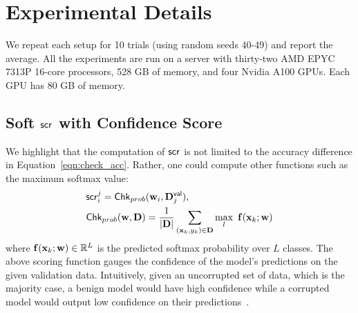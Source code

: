 

\section{Experimental Details}
We repeat each setup for 10 trials (using random seeds 40-49) and report the average.
All the experiments are run on a server with thirty-two AMD EPYC 7313P 16-core processors, 528 GB of memory, and four Nvidia A100 GPUs. Each GPU has 80 GB of memory.




\subsection{Soft $\mathsf{scr}^{}_{}$ with Confidence Score}
\label{app:softscore}
We highlight that the computation of $\mathsf{scr}^{}_{}$ is not limited to the accuracy difference in Equation~\ref{eqn:check_acc}. Rather,  one could compute other functions such as the maximum softmax value:
\begin{align}
\label{eqn:check_prob}
    &\score{i}{j} = \msf{Chk}_{prob}(\bfw_i, \bfD^{\msf{val}}_j) , \\ \nonumber
    &\msf{Chk}_{prob}(\bfw, \bfD) = \frac{1}{|\bfD|} \sum_{(\bfx_k, y_k) \in \bfD} \max_l ~ \bff(\bfx_k; \bfw)
\end{align}
where $\mathbf{f}(\mathbf{x}_k; \mathbf{w}) \in \mathbb{R}^L$ is the predicted softmax probability over $L$ classes.
The above scoring function gauges the confidence of the model's predictions on the given validation data. Intuitively, given an uncorrupted set of data, which is the majority case, a benign model would have high confidence while a corrupted model would output low confidence on their predictions~\cite{hendrycks2022msp, hendrycks2022scaling}.


